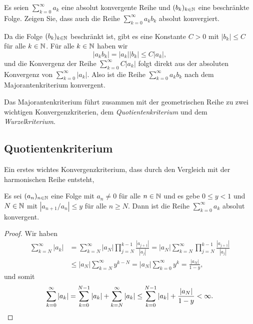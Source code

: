 \documentclass[a4paper,10pt]{article}
\begin{document}
\begin{question}\label{qst: absolut konvergent und beschränkt}
 Es seien $\sum_{k=0}^\infty a_k$ eine absolut konvergente Reihe und $(b_k)_{k \in \mathbb{N}}$ eine beschränkte Folge. Zeigen  Sie, dass auch die Reihe $\sum_{k=0}^\infty a_k b_k$ absolut konvergiert.
\end{question}
\begin{solution}
 Da die Folge $(b_k)_{k \in \mathbb{N}}$ beschränkt ist, gibt es eine Konstante $C > 0$ mit $|b_k| \leq C$ für alle $k \in \mathbb{N}$. Für alle $k \in \mathbb{N}$ haben wir
 \[
  |a_k b_k|
  = |a_k| |b_k|
  \leq C |a_k|,
 \]
 und die Konvergenz der Reihe $\sum_{k=0}^\infty C |a_k|$ folgt direkt aus der absoluten Konvergenz von $\sum_{k=0}^\infty |a_k|$. Also ist die Reihe $\sum_{k=0}^\infty a_k b_k$ nach dem Majorantenkriterium konvergent.
\end{solution}


Das Majorantenkriterium führt zusammen mit der geometrischen Reihe zu zwei wichtigen Konvergenzkriterien, dem \emph{Quotientenkriterium} und dem \emph{Wurzelkriterium}.





\subsection{Quotientenkriterium}
Ein erstes wichtes Konvergenzkriterium, dass durch den Vergleich mit der harmonischen Reihe entsteht, 


\begin{prop}
 Es sei $(a_n)_{n \in \mathbb{N}}$ eine Folge mit $a_n \neq 0$ für alle $n \in \mathbb{N}$ und es gebe $0 \leq y < 1$ und $N \in \mathbb{N}$ mit $|a_{n+1}/a_n| \leq y$ für alle $n \geq N$. Dann ist die Reihe $\sum_{k=0}^\infty a_k$ absolut konvergent.
\end{prop}
\begin{proof}
 Wir haben
 \begin{align*}
  \sum_{k=N}^\infty |a_k|
  &= \sum_{k=N}^\infty |a_N| \prod_{j=N}^{k-1} \frac{|a_{j+1}|}{|a_j|}
  = |a_N| \sum_{k=N}^\infty \prod_{j=N}^{k-1} \frac{|a_{j+1}|}{|a_j|} \\
  &\leq |a_N| \sum_{k=N}^\infty y^{k-N}
  = |a_N| \sum_{k=0}^\infty y^k
  = \frac{|a_N|}{1-y},
 \end{align*}
 und somit
 \[
  \sum_{k=0}^\infty |a_k|
  = \sum_{k=0}^{N-1} |a_k| + \sum_{k=N}^\infty |a_k|
  \leq \sum_{k=0}^{N-1} |a_k| + \frac{|a_N|}{1-y}
  < \infty.
  \qedhere
 \]
\end{proof}
\end{document}
